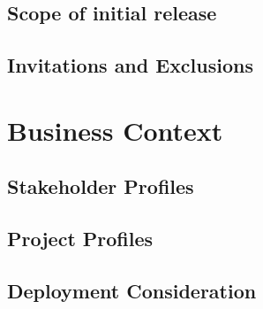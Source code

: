 \section{Scope of initial release}

\section{Invitations and Exclusions}

\chapter{Business Context}

\section{Stakeholder Profiles}


\section{Project Profiles}

\section{Deployment Consideration}



